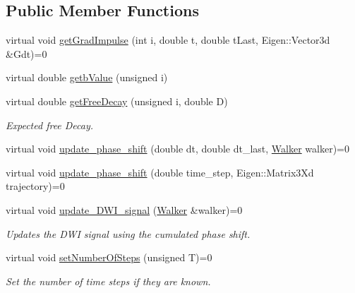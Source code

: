 \subsection*{Public Member Functions}
\begin{DoxyCompactItemize}
\item 
virtual void \hyperlink{class_simulable_sequence_a03a417776f5404b06c761ab9109e3e1d}{get\+Grad\+Impulse} (int i, double t, double t\+Last, Eigen\+::\+Vector3d \&Gdt)=0
\item 
virtual double \hyperlink{class_simulable_sequence_a85cdcf5f7bd5bed804a816e3c18840b7}{getb\+Value} (unsigned i)
\item 
\mbox{\label{class_simulable_sequence_a31a328cc716e039a53f9b12122050b83}} 
virtual double \hyperlink{class_simulable_sequence_a31a328cc716e039a53f9b12122050b83}{get\+Free\+Decay} (unsigned i, double D)
\begin{DoxyCompactList}\small\item\em Expected free Decay. \end{DoxyCompactList}\item 
virtual void \hyperlink{class_simulable_sequence_ad7b2a30f563343aa65489aa553d4df63}{update\+\_\+phase\+\_\+shift} (double dt, double dt\+\_\+last, \hyperlink{class_walker}{Walker} walker)=0
\item 
virtual void \hyperlink{class_simulable_sequence_a175197d165ee7852094bc70cadc59589}{update\+\_\+phase\+\_\+shift} (double time\+\_\+step, Eigen\+::\+Matrix3\+Xd trajectory)=0
\item 
\mbox{\label{class_simulable_sequence_af5621196178ee78b27e740dfe360815e}} 
virtual void \hyperlink{class_simulable_sequence_af5621196178ee78b27e740dfe360815e}{update\+\_\+\+D\+W\+I\+\_\+signal} (\hyperlink{class_walker}{Walker} \&walker)=0
\begin{DoxyCompactList}\small\item\em Updates the D\+WI signal using the cumulated phase shift. \end{DoxyCompactList}\item 
\mbox{\label{class_simulable_sequence_a2e16c0b0dcf1b90ad0afc53ab14e9250}} 
virtual void \hyperlink{class_simulable_sequence_a2e16c0b0dcf1b90ad0afc53ab14e9250}{set\+Number\+Of\+Steps} (unsigned T)=0
\begin{DoxyCompactList}\small\item\em Set the number of time steps if they are known. \end{DoxyCompactList}\item 

\end{DoxyCompactItemize}
